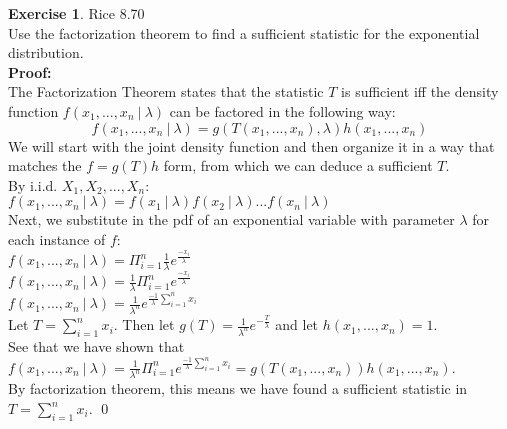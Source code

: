 \documentclass[11pt]{article}
\theoremstyle{definition}
\newtheorem{exercise}[theorem]{Exercise}
\newcommand{\st}{\ |\ }
\newcommand{\V}{\vspace{0.3cm}\\}
\newcommand{\pro}{\V \textbf{Proof:} \V}
\begin{document}
\begin{exercise} Rice 8.70\\
Use the factorization theorem to find a sufficient statistic for the exponential distribution. \pro
The Factorization Theorem states that the statistic $T$ is sufficient iff the density function $f(x_1, ..., x_n \st \lambda)$ can be factored in the following way: $$f(x_1,...,x_n \st \lambda) = g(T(x_1,...,x_n), \lambda) h(x_1,...,x_n) $$
We will start with the joint density function and then organize it in a way that matches the $f = g(T)h$ form, from which we can deduce a sufficient $T$. \V
By i.i.d. $X_1,X_2,...,X_n$: \V
$f(x_1,...,x_n \st \lambda) = f(x_1 \st \lambda)f(x_2 \st \lambda)...f(x_n \st \lambda)$ \V
Next, we substitute in the pdf of an exponential variable with parameter $\lambda$ for each instance of $f$: \V
$\displaystyle f(x_1,...,x_n \st \lambda) = \Pi_{i=1}^n \frac{1}{\lambda} e^{\frac{-x_i}{\lambda}}$ \V
$\displaystyle f(x_1,...,x_n \st \lambda) = \frac{1}{\lambda} \Pi_{i=1}^n  e^{\frac{-x_i}{\lambda}}$ \V
$\displaystyle f(x_1,...,x_n \st \lambda) = \frac{1}{\lambda^n}  e^{\frac{-1}{\lambda} \sum_{i=1}^n x_i}$ \V
Let $T = \sum_{i=1}^n x_i$. Then let $g(T) = \frac{1}{\lambda^n} e^{-\frac{T}{\lambda}}$ and let $h(x_1,...,x_n) = 1$. \V
See that we have shown that $f(x_1,...,x_n \st \lambda) = \frac{1}{\lambda^n} \Pi_{i=1}^n  e^{\frac{-1}{\lambda} \sum_{i=1}^n x_i} = g(T(x_1,...,x_n))h(x_1,...,x_n)$. \V
By factorization theorem, this means we have found a sufficient statistic in $T = \sum_{i=1}^n x_i$. \qed 

\end{exercise}
\end{document}
